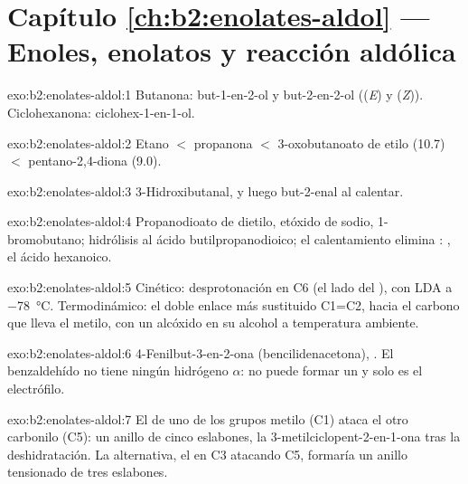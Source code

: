 \section*{Capítulo \ref{ch:b2:enolates-aldol} --- Enoles, enolatos y reacción aldólica}

\begin{solution}{exo:b2:enolates-aldol:1}
Butanona: but-1-en-2-ol  y but-2-en-2-ol  ((\textit{E}) y
(\textit{Z})). Ciclohexanona: ciclohex-1-en-1-ol.
\end{solution}

\begin{solution}{exo:b2:enolates-aldol:2}
Etano $<$ propanona $<$ 3-oxobutanoato de etilo (10.7) $<$ pentano-2,4-diona (9.0).
\end{solution}

\begin{solution}{exo:b2:enolates-aldol:3}
3-Hidroxibutanal, y luego but-2-enal al calentar.
\end{solution}

\begin{solution}{exo:b2:enolates-aldol:4}
Propanodioato de dietilo, etóxido de sodio, 1-bromobutano; hidrólisis al ácido butilpropanodioico;
el calentamiento elimina : , el ácido hexanoico.
\end{solution}

\begin{solution}{exo:b2:enolates-aldol:5}
Cinético: desprotonación en C6 (el lado del ), con LDA a \qty{-78}{\degreeCelsius}. Termodinámico:
el doble enlace más sustituido C1=C2, hacia el carbono que lleva el metilo, con un alcóxido en su
alcohol a temperatura ambiente.
\end{solution}

\begin{solution}{exo:b2:enolates-aldol:6}
4-Fenilbut-3-en-2-ona (bencilidenacetona), . El benzaldehído no tiene ningún hidrógeno $\alpha$:
no puede formar un  y solo es el electrófilo.
\end{solution}

\begin{solution}{exo:b2:enolates-aldol:7}
El  de uno de los grupos metilo (C1) ataca el otro carbonilo (C5): un anillo de cinco eslabones,
la 3-metilciclopent-2-en-1-ona tras la deshidratación. La alternativa, el  en C3 atacando C5,
formaría un anillo tensionado de tres eslabones.
\end{solution}

